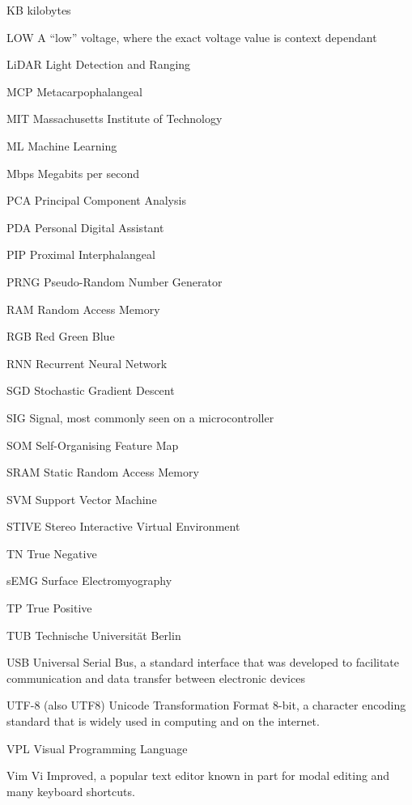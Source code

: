 \begin{Nomencl}[1cm]
    \item[KB] kilobytes
    \item[LOW] A ``low'' voltage, where the exact voltage value is context dependant
    \item[LiDAR] Light Detection and Ranging
    \item[MCP] Metacarpophalangeal
    \item[MIT] Massachusetts Institute of Technology
    \item[ML] Machine Learning
    \item[Mbps] Megabits per second
    \item[PCA] Principal Component Analysis
    \item[PDA] Personal Digital Assistant
    \item[PIP] Proximal Interphalangeal
    \item[PRNG] Pseudo-Random Number Generator
    \item[RAM] Random Access Memory
    \item[RGB] Red Green Blue
    \item[RNN] Recurrent Neural Network
    \item[SGD] Stochastic Gradient Descent
    \item[SIG] Signal, most commonly seen on a microcontroller
    \item[SOM] Self-Organising Feature Map
    \item[SRAM] Static Random Access Memory
    \item[SVM] Support Vector Machine
    \item[STIVE] Stereo Interactive Virtual Environment
    \item[TN] True Negative
    \item[sEMG] Surface Electromyography
    \item[TP] True Positive
    \item[TUB] Technische Universität Berlin
    \item[USB] Universal Serial Bus, a standard interface that was developed to
        facilitate communication and data transfer between electronic devices
    \item[UTF-8] (also UTF8) Unicode Transformation Format 8-bit, a character
        encoding standard that is widely used in computing and on the internet.
    \item[VPL] Visual Programming Language
    \item[Vim] Vi Improved, a popular text editor known in part for modal
        editing and many keyboard shortcuts.


\end{Nomencl}
